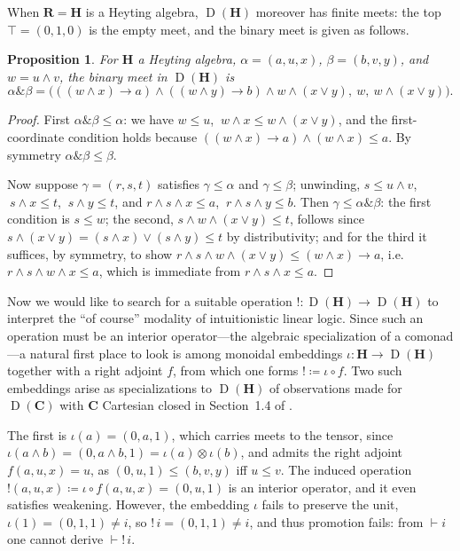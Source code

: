 \documentclass[reqno]{amsart}
\theoremstyle{plain}
\newtheorem{prop}[thm]{Proposition}
\theoremstyle{definition}
\DeclareMathOperator{\D}{D}
\newcommand{\cf}[1]{\mathbf{#1}}
\DeclareMathOperator{\Amp}{\&}
\begin{document}
When $\cf{R} = \cf{H} $ is a Heyting algebra, $\D(\cf{H}) $ moreover has finite meets: the top $\top = (0,1,0)$ is the empty meet, and the binary meet is given as follows.
\begin{prop}\label{prop: meet}
    For $\cf{H}$ a Heyting algebra, $\alpha = (a,u,x)$, $\beta = (b,v,y)$, and $w = u\wedge v$, the binary meet in $\D(\cf{H})$ is
    \begin{equation*}
        \alpha \Amp \beta = \bigl(((w \wedge x) \rightarrow a ) \wedge ((w \wedge y)\rightarrow b) \wedge w \wedge (x \vee y),\ w,\ w \wedge (x \vee y)\bigr).
    \end{equation*}
\end{prop}
\begin{proof}
    First $\alpha\Amp\beta \leq \alpha$: we have $w\leq u$, $\ w\wedge x \leq w\wedge(x\vee y)$, and the first-coordinate condition holds because $((w\wedge x)\rightarrow a)\wedge(w\wedge x)\leq a$. By symmetry $\alpha\Amp\beta\leq\beta$.

    Now suppose $\gamma = (r,s,t)$ satisfies $\gamma\leq\alpha$ and $\gamma\leq\beta$; unwinding, $s\leq u\wedge v$, $\ s\wedge x\leq t$, $\ s\wedge y\leq t$, and $r\wedge s\wedge x\leq a$, $\ r\wedge s\wedge y\leq b$. Then $\gamma\leq\alpha\Amp\beta$: the first condition is $s\leq w$; the second, $s\wedge w\wedge(x\vee y)\leq t$, follows since $s\wedge(x\vee y) = (s\wedge x)\vee(s\wedge y)\leq t$ by distributivity; and for the third it suffices, by symmetry, to show $r\wedge s\wedge w\wedge(x\vee y)\leq (w\wedge x)\rightarrow a$, i.e.\ $r\wedge s\wedge w\wedge x\leq a$, which is immediate from $r\wedge s\wedge x\leq a$.
\end{proof}


Now we would like to search for a suitable operation $ {!} \colon {\D(\cf{H}) \to \D(\cf{H})} $ to interpret the ``of course'' modality of intuitionistic linear logic. 
Since such an operation must be an interior operator---the algebraic specialization of a comonad---a natural first place to look is among monoidal embeddings $ \iota \colon \cf{H} \to \D(\cf{H}) $ together with a right adjoint $ f $, from which one forms $ {!} \coloneqq \iota \circ f $. Two such embeddings arise as specializations to $ \D(\cf{H}) $ of observations made for $ \D(\cf{C}) $ with $ \cf{C} $ Cartesian closed in Section~1.4 of \cite{dePaiva1991}.

The first is $ \iota(a) = (0,a,1) $, which carries meets to the tensor, since $ \iota(a \wedge b) = (0, a \wedge b, 1) = \iota(a) \otimes \iota(b) $, and admits the right adjoint $ f(a,u,x) = u $, as $ (0,u,1) \leq (b,v,y) $ iff $ u \leq v $. The induced operation $ !(a,u,x) \coloneqq \iota \circ f(a,u,x) = (0,u,1) $ is an interior operator, and it even satisfies weakening. However, the embedding $ \iota $ fails to preserve the unit, $ \iota(1) = (0,1,1) \neq i $, so $ {!}\,i = (0,1,1) \neq i $, and thus promotion fails: from $ \vdash i $ one cannot derive $ \vdash {!}\,i $.
\end{document}
